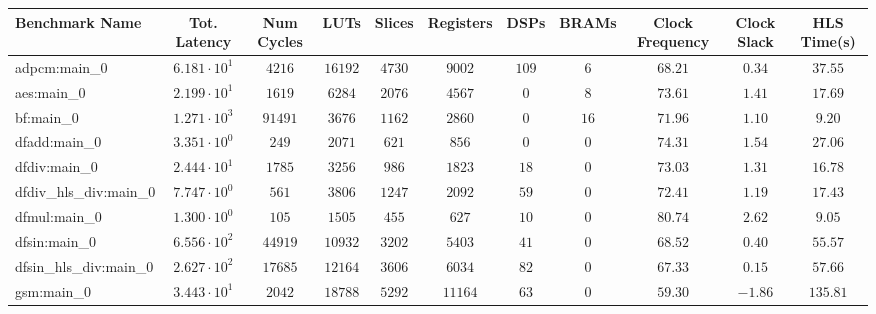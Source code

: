 \begin{tabular}{|l|c|c|c|c|c|c|c|c|c|c|}
\hline
Benchmark Name          & Tot. Latency           & Num Cycles & LUTs       & Slices    & Registers & DSPs    & BRAMs  & Clock Frequency & Clock Slack & HLS Time(s) \\
\hline
adpcm:main\_0           & $ 6.181 \cdot 10^{1} $ & $ 4216   $ & $ 16192  $ & $ 4730  $ & $ 9002  $ & $ 109 $ & $ 6  $ & $ 68.21       $ & $ 0.34    $ & $ 37.55   $ \\
aes:main\_0             & $ 2.199 \cdot 10^{1} $ & $ 1619   $ & $ 6284   $ & $ 2076  $ & $ 4567  $ & $ 0   $ & $ 8  $ & $ 73.61       $ & $ 1.41    $ & $ 17.69   $ \\
bf:main\_0              & $ 1.271 \cdot 10^{3} $ & $ 91491  $ & $ 3676   $ & $ 1162  $ & $ 2860  $ & $ 0   $ & $ 16 $ & $ 71.96       $ & $ 1.10    $ & $ 9.20    $ \\
dfadd:main\_0           & $ 3.351 \cdot 10^{0} $ & $ 249    $ & $ 2071   $ & $ 621   $ & $ 856   $ & $ 0   $ & $ 0  $ & $ 74.31       $ & $ 1.54    $ & $ 27.06   $ \\
dfdiv:main\_0           & $ 2.444 \cdot 10^{1} $ & $ 1785   $ & $ 3256   $ & $ 986   $ & $ 1823  $ & $ 18  $ & $ 0  $ & $ 73.03       $ & $ 1.31    $ & $ 16.78   $ \\
dfdiv\_hls\_div:main\_0 & $ 7.747 \cdot 10^{0} $ & $ 561    $ & $ 3806   $ & $ 1247  $ & $ 2092  $ & $ 59  $ & $ 0  $ & $ 72.41       $ & $ 1.19    $ & $ 17.43   $ \\
dfmul:main\_0           & $ 1.300 \cdot 10^{0} $ & $ 105    $ & $ 1505   $ & $ 455   $ & $ 627   $ & $ 10  $ & $ 0  $ & $ 80.74       $ & $ 2.62    $ & $ 9.05    $ \\
dfsin:main\_0           & $ 6.556 \cdot 10^{2} $ & $ 44919  $ & $ 10932  $ & $ 3202  $ & $ 5403  $ & $ 41  $ & $ 0  $ & $ 68.52       $ & $ 0.40    $ & $ 55.57   $ \\
dfsin\_hls\_div:main\_0 & $ 2.627 \cdot 10^{2} $ & $ 17685  $ & $ 12164  $ & $ 3606  $ & $ 6034  $ & $ 82  $ & $ 0  $ & $ 67.33       $ & $ 0.15    $ & $ 57.66   $ \\
gsm:main\_0             & $ 3.443 \cdot 10^{1} $ & $ 2042   $ & $ 18788  $ & $ 5292  $ & $ 11164 $ & $ 63  $ & $ 0  $ & $ 59.30       $ & $ -1.86   $ & $ 135.81  $ \\

\end{tabular}
